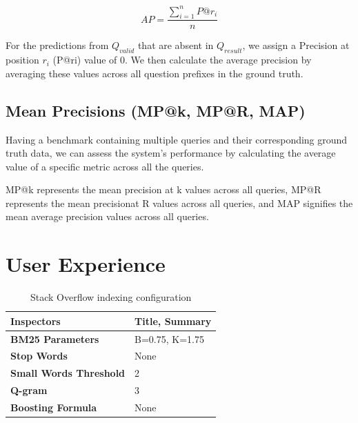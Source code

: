 {\begin{equation}
AP = \frac{\sum_{i=1}^{n} P@r_i}{n}
\label{eq:depth}
\end{equation}

For the predictions from $Q_{valid}$ that are absent in $Q_{result}$, we assign a Precision at position $r_i $ (P@ri) value of 0. We then calculate the average precision by averaging these values across all question prefixes in the ground truth.

\subsection*{Mean Precisions (MP@k, MP@R, MAP)}
Having a benchmark containing multiple queries and their corresponding ground truth data, we can assess the system's performance by calculating the average value of a specific metric across all the queries.

MP@k represents the mean precision at k values across all queries, MP@R represents the mean precisionat R values across all queries, and MAP signifies the mean average precision values across all queries.

\section{User Experience} 
 
\begin{table}[ht] 
{\footnotesize
\begin{tabular}{ P{3cm} ||P{10.1cm}  }      %
 \hline \hline
\textbf{Inspectors} & Title, Summary \T\B 
\\ 
\hline
\textbf{BM25 Parameters} & B=0.75, K=1.75\T\B 
\\ 
\hline
\textbf{Stop Words} & None\T\B 
\\ 
\hline
\textbf{Small Words Threshold} & 2\T\B 
\\ 
\hline
\textbf{Q-gram} & 3\T\B 
\\ 
\hline
\textbf{Boosting Formula} & None\T\B 
\\ 
\hline \hline
    \end{tabular}
}
  \captionsetup{justification=centering,margin=2cm}
  \caption{Stack Overflow indexing configuration}
\end{table}


}

